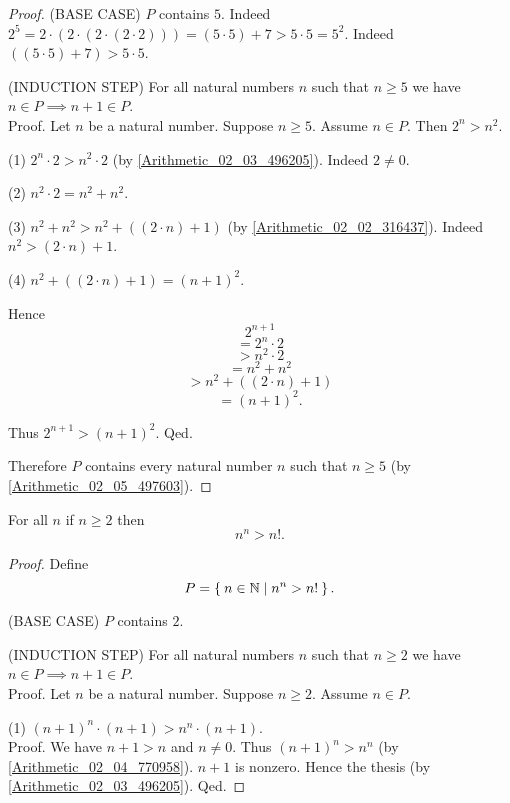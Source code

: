 \documentclass[../../arithmetic.ftl.tex]{subfiles}
\begin{document}
\begin{forthel}
\begin{proof}
      (BASE CASE) $P$ contains $5$.
      Indeed $2^{5} = 2 \cdot (2 \cdot (2 \cdot (2 \cdot 2))) = (5 \cdot 5) + 7 > 5 \cdot 5 = 5^{2}$.
      Indeed $((5 \cdot 5) + 7) > 5 \cdot 5$.

      (INDUCTION STEP) For all natural numbers $n$ such that $n \geq 5$ we have $n \in P \implies n + 1 \in P$. \\
      Proof.
        Let $n$ be a natural number.
        Suppose $n \geq 5$.
        Assume $n \in P$.
        Then $2^{n} > n^{2}$.

        (1) $2^{n} \cdot 2 > n^{2} \cdot 2$ (by \ref{Arithmetic_02_03_496205}).
        Indeed $2 \neq 0$.

        (2) $n^{2} \cdot 2 = n^{2} + n^{2}$.

        (3) $n^{2} + n^{2} > n^{2} + ((2 \cdot n) + 1)$ (by \ref{Arithmetic_02_02_316437}).
        Indeed $n^{2} > (2 \cdot n) + 1$.

        (4) $n^{2} + ((2 \cdot n) + 1) = (n + 1)^{2}$.

        Hence
        \[   2^{n + 1} \]
        \[ = 2^{n} \cdot 2 \]
        \[ > n^{2} \cdot 2 \]
        \[ = n^{2} + n^{2} \]
        \[ > n^{2} + ((2 \cdot n) + 1) \]
        \[ = (n + 1)^{2}. \]

        Thus $2^{n + 1} > (n + 1)^{2}$.
      Qed.

      Therefore $P$ contains every natural number $n$ such that $n \geq 5$ (by \ref{Arithmetic_02_05_497603}).
    \end{proof}


    \begin{proposition}\label{Arithmetic_02_06_527159}
      For all $n$ if $n \geq 2$ then \[ n^{n} > n!. \]
    \end{proposition}
    \begin{proof}
      Define \[ P = \Set{n \in \mathbb{N} | n^{n} > n!}. \]

      (BASE CASE) $P$ contains $2$.

      (INDUCTION STEP) For all natural numbers $n$ such that $n \geq 2$ we have $n \in P \implies n + 1 \in P$. \\
      Proof.
        Let $n$ be a natural number.
        Suppose $n \geq 2$.
        Assume $n \in P$.

        (1) $(n + 1)^{n} \cdot (n + 1) > n^{n} \cdot (n + 1)$. \\
        Proof.
          We have $n + 1 > n$ and $n \neq 0$.
          Thus $(n + 1)^{n} > n^{n}$ (by \ref{Arithmetic_02_04_770958}).
          $n + 1$ is nonzero.
          Hence the thesis (by \ref{Arithmetic_02_03_496205}).
        Qed.


\end{proof}
\end{forthel}
\end{document}
